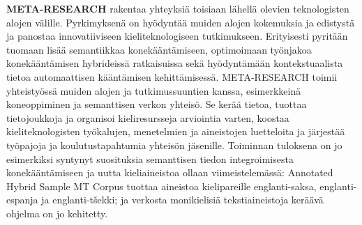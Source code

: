 \documentclass[]{../../metanetpaper}
\begin{document}
\begin{multicols}{2}
\textbf{META-RESEARCH} rakentaa yhteyksiä toisiaan lähellä olevien
teknologisten alojen välille. Pyrkimyksenä on hyödyntää muiden alojen
kokemuksia ja edistystä ja panostaa innovatiiviseen kieliteknologiseen
tutkimukseen. Erityisesti pyritään tuomaan lisää semantiikkaa
konekääntämiseen, optimoimaan työnjakoa konekääntämisen hybrideissä
ratkaisuissa sekä hyödyntämään kontekstuaalista tietoa automaattisen
kääntämisen kehittämisessä. META-RESEARCH toimii yhteistyössä muiden
alojen ja tutkimussuuntien kanssa, esimerkkeinä koneoppiminen ja
semanttisen verkon yhteisö. Se kerää tietoa, tuottaa tietojoukkoja ja
organisoi kieliresursseja arviointia varten, koostaa
kieliteknologisten työkalujen, menetelmien ja aineistojen luetteloita
ja järjestää työpajoja ja koulutustapahtumia yhteisön
jäsenille. Toiminnan tuloksena on jo esimerkiksi syntynyt suosituksia
semanttisen tiedon integroimisesta konekääntämiseen ja uutta
kieliaineistoa ollaan viimeistelemässä: Annotated Hybrid Sample MT
Corpus tuottaa aineistoa kielipareille englanti-saksa,
englanti-espanja ja englanti-tšekki; ja verkosta monikielisiä
tekstiaineistoja keräävä ohjelma on jo kehitetty.
\end{multicols}

\clearpage
\end{document}
